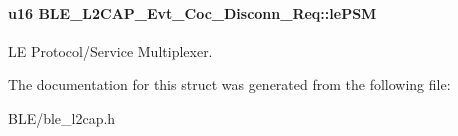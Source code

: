 \paragraph[{\texorpdfstring{le\+P\+SM}{lePSM}}]{\setlength{\rightskip}{0pt plus 5cm}u16 B\+L\+E\+\_\+\+L2\+C\+A\+P\+\_\+\+Evt\+\_\+\+Coc\+\_\+\+Disconn\+\_\+\+Req\+::le\+P\+SM}\hypertarget{struct_b_l_e___l2_c_a_p___evt___coc___disconn___req_a82b47ab8ebe5a475d04676bfdb9014aa}{}\label{struct_b_l_e___l2_c_a_p___evt___coc___disconn___req_a82b47ab8ebe5a475d04676bfdb9014aa}
LE Protocol/\+Service Multiplexer. 

The documentation for this struct was generated from the following file\+:\begin{DoxyCompactItemize}
\item 
B\+L\+E/ble\+\_\+l2cap.\+h\end{DoxyCompactItemize}
